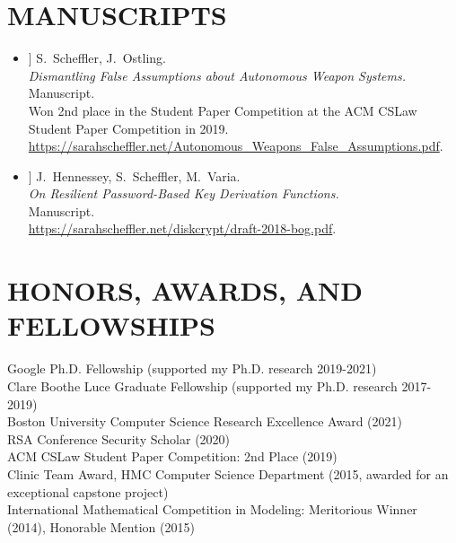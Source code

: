 \documentclass{res}
\begin{document}
\begin{resume}
%
%

\vspace{0.25in}

\section{MANUSCRIPTS}
\vspace{0.25in}

\newcommand{\autonomousWeapons}{[15]\xspace}
\newcommand{\bog}{[16]\xspace}

\begin{itemize}
\item[\autonomousWeapons] S.~Scheffler, J.~Ostling. \\
\emph{Dismantling False Assumptions about Autonomous Weapon Systems.} \\
Manuscript.  \\
Won 2nd place in the Student Paper Competition at the ACM CSLaw Student Paper Competition in 2019. \\
\url{https://sarahscheffler.net/Autonomous_Weapons_False_Assumptions.pdf}.

\item[\bog] J.~Hennessey, S.~Scheffler, M.~Varia. \\
\emph{On Resilient Password-Based Key Derivation Functions.} \\
Manuscript.  \\
\url{https://sarahscheffler.net/diskcrypt/draft-2018-bog.pdf}.
\end{itemize}

\vspace{0.25in}

\section{HONORS, AWARDS, AND FELLOWSHIPS}
\vspace{0.1in}
    Google Ph.D. Fellowship (supported my Ph.D. research 2019-2021) \\
    Clare Boothe Luce Graduate Fellowship (supported my Ph.D. research 2017-2019) \\
    Boston University Computer Science Research Excellence Award (2021) \\
    RSA Conference Security Scholar (2020) \\
    ACM CSLaw Student Paper Competition: 2nd Place (2019) \\
    Clinic Team Award, HMC Computer Science Department (2015, awarded for an exceptional capstone project) \\
    International Mathematical Competition in Modeling: Meritorious Winner (2014), Honorable Mention (2015) \\       


\end{resume}
\end{document}
